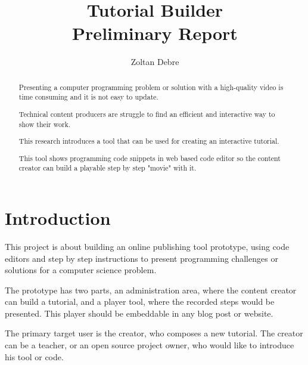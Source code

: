 \documentclass[11pt
              , a4paper
              , twoside
              , openright
              ]{report}
\title{%
Tutorial Builder \\
\large Preliminary Report}
\author{Zoltan Debre}
\begin{document}
\frontmatter



\begin{abstract}

Presenting a computer programming problem or solution with a high-quality video is time consuming and it is not easy to update.

Technical content producers are struggle to find an efficient and interactive way to show their work.

This research introduces a tool that can be used for creating an interactive tutorial.

This tool shows programming code snippets in web based code editor so the content creator can build a playable step by step "movie" with it.

\end{abstract}


\maketitle

\tableofcontents


\mainmatter


\chapter{Introduction}

This project is about building an online publishing tool prototype, using code editors and step by step instructions to present programming challenges or solutions for a computer science problem.

The prototype has two parts, an administration area, where the content creator can build a tutorial, and a player tool, where the recorded steps would be presented. This player should be embeddable in any blog post or website.

The primary target user is the creator, who composes a new tutorial. The creator can be a teacher, or an open source project owner, who would like to introduce his tool or code.
\end{document}
